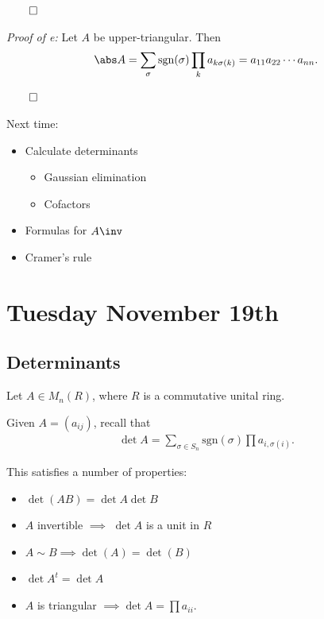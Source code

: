 \(\qed\)

\emph{Proof of e:} Let \(A\) be upper-triangular. Then
\begin{align*}
\abs A = \sum_\sigma \mathrm{sgn}(\sigma) \prod_k a_{k \sigma(k)} = a_{11} a_{22} \cdots a_{nn}
.\end{align*}

\(\qed\)

Next time:

\begin{itemize}
\tightlist
\item
  Calculate determinants

  \begin{itemize}
  \tightlist
  \item
    Gaussian elimination
  \item
    Cofactors
  \end{itemize}
\item
  Formulas for \(A\inv\)
\item
  Cramer's rule
\end{itemize}

\hypertarget{tuesday-november-19th}{%
\section{Tuesday November 19th}\label{tuesday-november-19th}}

\hypertarget{determinants}{%
\subsection{Determinants}\label{determinants}}

Let \(A\in M_n(R)\), where \(R\) is a commutative unital ring.

Given \(A = (a_{ij})\), recall that
\begin{align*}
\det A = \sum_{\sigma \in S_n} \mathrm{sgn}(\sigma) \prod a_{i, \sigma(i)}
.\end{align*}

This satisfies a number of properties:

\begin{itemize}
\item
  \(\det(AB) = \det A \det B\)
\item
  \(A\) invertible \(\implies\) \(\det A\) is a unit in \(R\)
\item
  \(A \sim B \implies \det(A) = \det(B)\)
\item
  \(\det A^t = \det A\)
\item
  \(A\) is triangular \(\implies \det A = \prod a_{ii}\).
\end{itemize}

